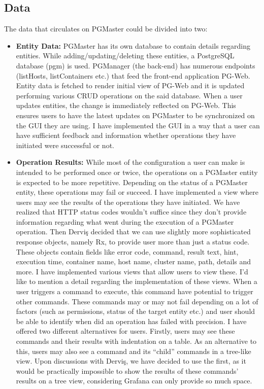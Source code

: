 \subsection{Data}
The data that circulates on PGMaster could be divided into two:
\begin{itemize}
    \item \textbf{Entity Data:} PGMaster has its own database to contain 
    details regarding entities. While adding/updating/deleting these entities, 
    a PostgreSQL database (pgm) is used. PGManager (the back-end) has numerous 
    endpoints (listHosts, listContainers etc.) that feed the front-end 
    application PG-Web. Entity data is fetched to render initial view of
    PG-Web and it is updated performing various CRUD operations on the said 
    database. When a user updates entities, the change is immediately 
    reflected on PG-Web. This ensures users to have the latest updates on 
    PGMaster to be synchronized on the GUI they are using. I have implemented 
    the GUI in a way that a user can have sufficient feedback and information 
    whether operations they have initiated were successful or not.
    \item \textbf{Operation Results:} While most of the configuration a user 
    can make is intended to be performed once or twice, the operations on a 
    PGMaster entity is expected to be more repetitive. Depending on the status 
    of a PGMaster entity, these operations may fail or succeed. I have 
    implemented a view where users may see the results of the operations they 
    have initiated. We have realized that HTTP status codes wouldn't suffice 
    since they don't provide information regarding what went during the 
    execution of a PGMaster operation. Then Derviş decided that we can use 
    slightly more sophisticated response objects, namely Rx, to provide user 
    more than just a status code. These objects contain fields like error 
    code, command, result text, hint, execution time, container name, host 
    name, cluster name, path, details and more. I have implemented various 
    views that allow users to view these. I'd like to mention a detail 
    regarding the implementation of these views. When a user triggers a 
    command to execute, this command have potential to trigger other commands. 
    These commands may or may not fail depending on a lot of factors (such 
    as permissions, status of the target entity etc.) and user should be 
    able to identify when did an operation has failed with precision. I have 
    offered two different alternatives for users. Firstly, users may see 
    these commands and their results with indentation on a table. As an 
    alternative to this, users may also see a command and its ``child'' 
    commands in a tree-like view. Upon discussions with Derviş, we have decided 
    to use the first, as it would be practically impossible to show the results 
    of these commands' results on a tree view, considering Grafana can only 
    provide so much space.

\end{itemize}


